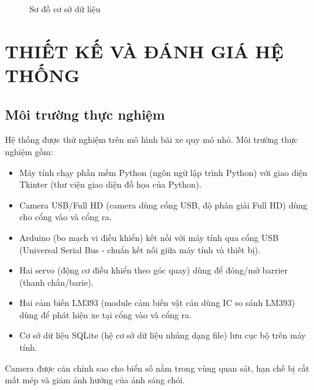 \documentclass[a4paper,14pt]{extreport}
\begin{document}
\begin{figure}[H]
\centering
{}
\caption{Sơ đồ cơ sở dữ liệu}
\label{fig:erd}
\end{figure}

\chapter{THIẾT KẾ VÀ ĐÁNH GIÁ HỆ THỐNG}

\section{Môi trường thực nghiệm}

Hệ thống được thử nghiệm trên mô hình bãi xe quy mô nhỏ. Môi trường thực nghiệm gồm:

\begin{itemize}[leftmargin=2em]
  \item Máy tính chạy phần mềm Python (ngôn ngữ lập trình Python) với giao diện Tkinter (thư viện giao diện đồ họa của Python).
  \item Camera USB/Full HD (camera dùng cổng USB, độ phân giải Full HD) dùng cho cổng vào và cổng ra.
  \item Arduino (bo mạch vi điều khiển) kết nối với máy tính qua cổng USB (Universal Serial Bus - chuẩn kết nối giữa máy tính và thiết bị).
  \item Hai servo (động cơ điều khiển theo góc quay) dùng để đóng/mở barrier (thanh chắn/barie).
  \item Hai cảm biến LM393 (module cảm biến vật cản dùng IC so sánh LM393) dùng để phát hiện xe tại cổng vào và cổng ra.
  \item Cơ sở dữ liệu SQLite (hệ cơ sở dữ liệu nhúng dạng file) lưu cục bộ trên máy tính.
\end{itemize}
Camera được căn chỉnh sao cho biển số nằm trong vùng quan sát, hạn chế bị cắt mất mép và giảm ảnh hưởng của ánh sáng chói.
\end{document}
